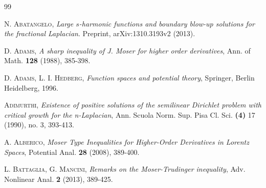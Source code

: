 \documentclass[11pt, a4paper]{article}
\begin{document}
\begin{thebibliography}{99}
\begin{small}
 \textsc{N. Abatangelo}, \emph{Large $s$-harmonic functions and boundary blow-up solutions for the fractional Laplacian}. Preprint, arXiv:1310.3193v2 (2013).

 \textsc{D. Adams,} \emph{A sharp inequality of J. Moser for higher order derivatives}, Ann. of Math. \textbf{128} (1988), 385-398.

 \textsc{D. Adams, L. I. Hedberg,} \emph{Function spaces and potential theory}, Springer, Berlin Heidelberg, 1996.

\textsc{Adimurthi,}  \emph{Existence of positive solutions of the semilinear Dirichlet problem with critical growth for the n-Laplacian}, Ann. Scuola Norm. Sup. Pisa Cl. Sci. \textbf{(4)} 17 (1990), no. 3, 393-413.



 \textsc{A. Alberico}, \emph{Moser Type Inequalities for Higher-Order Derivatives in Lorentz Spaces}, Potential Anal. \textbf{28} (2008), 389-400.

 \textsc{L. Battaglia, G. Mancini}, \emph{Remarks on the Moser-Trudinger inequality}, Adv. Nonlinear Anal. \textbf{2} (2013), 389-425.









\end{small}
\end{thebibliography}
\end{document}
